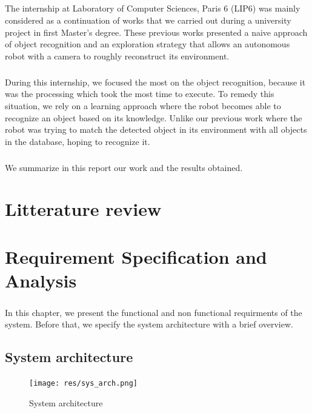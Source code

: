 \documentclass[12pt]{report}
\begin{document}
\paragraph{}
The internship at Laboratory of Computer Sciences, Paris 6 (LIP6) was mainly considered as a continuation of works that we carried out during a university project in first Master's degree. These previous works presented a naive approach of object recognition and an exploration strategy that allows an autonomous robot with a camera to roughly reconstruct its environment.

\paragraph{}
During this internship, we focused the most on the object recognition, because it was the processing which took the most time to execute. To remedy this situation, we rely on a learning approach where the robot becomes able to recognize an object based on its knowledge. Unlike our previous work where the robot was trying to match the detected object in its environment with all objects in the database, hoping to recognize it.

\paragraph{}
We summarize in this report our work and the results obtained.

\chapter{Litterature review}
\chapter{Requirement Specification and Analysis}
\paragraph{}
In this chapter, we present the functional and non functional requirments of the system. Before that, we specify the system architecture with a brief overview.
\section{System architecture}
\begin{figure}[H]
	\begin{center}
		\texttt{[image: res/sys\_arch.png]}
		\caption{System architecture}
	\end{center}
\end{figure}
\end{document}
